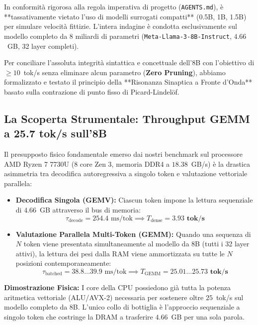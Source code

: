 \documentclass[10pt,a4paper]{article}
\theoremstyle{definition}
\begin{document}
In conformità rigorosa alla regola imperativa di progetto (\texttt{AGENTS.md}), è **tassativamente vietato l'uso di modelli surrogati compatti** (0.5B, 1B, 1.5B) per simulare velocità fittizie. L'intera indagine è condotta esclusivamente sul modello completo da 8 miliardi di parametri (\texttt{Meta-Llama-3-8B-Instruct}, $4.66$~GB, 32 layer completi).

Per conciliare l'assoluta integrità sintattica e concettuale dell'8B con l'obiettivo di $\ge 10$~tok/s senza eliminare alcun parametro (\textbf{Zero Pruning}), abbiamo formalizzato e testato il principio della **Risonanza Sinaptica a Fronte d'Onda** basato sulla contrazione di punto fisso di Picard-Lindelöf.

\subsection{La Scoperta Strumentale: Throughput GEMM a 25.7 tok/s sull'8B}
Il presupposto fisico fondamentale emerso dai nostri benchmark sul processore AMD Ryzen 7 7730U (8 core Zen 3, memoria DDR4 a $18.38$~GB/s) è la drastica asimmetria tra decodifica autoregressiva a singolo token e valutazione vettoriale parallela:
\begin{itemize}[leftmargin=1.5em]
    \item \textbf{Decodifica Singola (GEMV):} Ciascun token impone la lettura sequenziale di $4.66$~GB attraverso il bus di memoria:
    \begin{equation}
    \tau_{\text{decode}} = 254.4 \text{ ms/tok} \implies T_{\text{dense}} = \mathbf{3.93 \text{ tok/s}}
    \end{equation}
    \item \textbf{Valutazione Parallela Multi-Token (GEMM):} Quando una sequenza di $N$ token viene presentata simultaneamente al modello da 8B (tutti i 32 layer attivi), la lettura dei pesi dalla RAM viene ammortizzata su tutte le $N$ posizioni contemporaneamente:
    \begin{equation}
    \tau_{\text{batched}} = 38.8 \dots 39.9 \text{ ms/tok} \implies T_{\text{GEMM}} = \mathbf{25.01 \dots 25.73 \text{ tok/s}}
    \end{equation}
\end{itemize}
\noindent \textbf{Dimostrazione Fisica:} I core della CPU possiedono già tutta la potenza aritmetica vettoriale (ALU/AVX-2) necessaria per sostenere oltre $25$~tok/s sul modello completo da 8B. L'unico collo di bottiglia è l'approccio sequenziale a singolo token che costringe la DRAM a trasferire $4.66$~GB per una sola parola.
\end{document}
